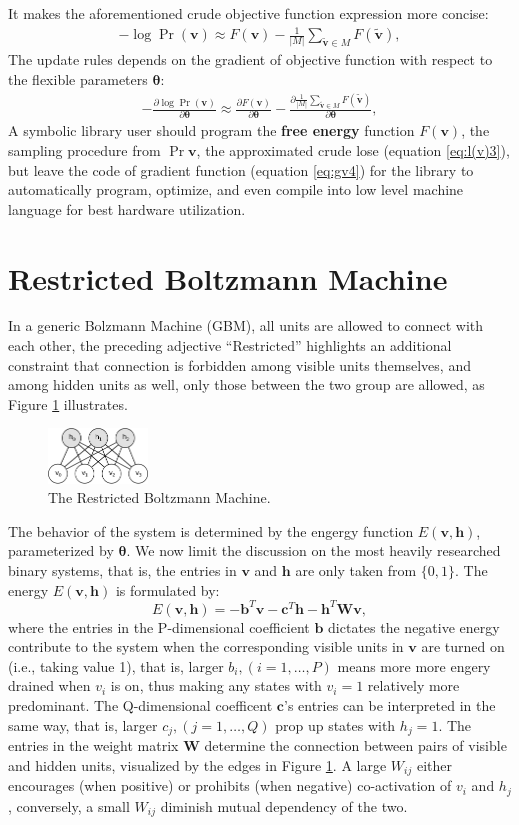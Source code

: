 \documentclass[11pt]{article}
\newcommand{\vb}{\boldsymbol{b}}
\newcommand{\vc}{\boldsymbol{c}}
\newcommand{\vh}{\boldsymbol{h}}
\newcommand{\vv}{\boldsymbol{v}}
\newcommand{\mw}{\boldsymbol{W}}
\newcommand{\vvt}{\tilde{\vv}}
\newcommand{\pEC}{\boldsymbol{\theta}}
\newcommand{\PDV}[2]{\frac{\partial #1}{\partial #2}}
\begin{document}
{It makes the aforementioned crude objective function expression more concise:
\begin{align}\label{eq:l(v)3}
  -\log{\Pr(\vv)} \approx F(\vv) - \frac{1}{|M|}\sum_{\vvt \in M}{F(\vvt)},
\end{align}
The update rules depends on the gradient of objective function with respect to the flexible parameters $\pEC$:
\begin{align}\label{eq:gv4}
  -\PDV{\log{\Pr(\vv)}}{\pEC} \approx \PDV{F(\vv)}{\pEC} - \PDV{\frac{1}{|M|}\sum_{\vvt \in M}{F(\vvt)}}{\pEC},
\end{align}
A symbolic library user should program the \textbf{free energy} function $F(\vv)$, the sampling procedure from $\Pr{\vv}$, the approximated crude lose (equation \ref{eq:l(v)3}), but leave the code of gradient function (equation \ref{eq:gv4}) for the library to automatically program, optimize, and even compile into low level machine language for best hardware utilization.

\section{Restricted Boltzmann Machine}
In a generic Bolzmann Machine (GBM), all units are allowed to connect with each other, the preceding adjective ``Restricted'' highlights an additional constraint that connection is forbidden among visible units themselves, and among hidden units as well, only those between the two group are allowed, as Figure \ref{fig:rbm} illustrates.
\begin{figure}[h]
  \centering
  \includegraphics[width=100px]{img/rbm.png}
  \caption{The Restricted Boltzmann Machine.}\label{fig:rbm}
\end{figure}
The behavior of the system is determined by the engergy function $E(\vv, \vh)$, parameterized by $\pEC$. We now limit the discussion on the most heavily researched binary systems, that is, the entries in $\vv$ and $\vh$ are only taken from $\{0, 1\}$. The energy $E(\vv, \vh)$ is formulated by:
\begin{equation} \label{eq:se_bin}
  E(\vv, \vh) = -\vb^T \vv - \vc^T \vh - \vh^T \mw \vv,
\end{equation}
where the entries in the P-dimensional coefficient $\vb$ dictates the negative energy contribute to the system when the corresponding visible units in $\vv$ are turned on (i.e., taking value 1), that is, larger $b_i, (i=1, \dots, P)$ means more more engery drained when $v_i$ is on, thus making any states with $v_i=1$ relatively more predominant. The Q-dimensional coefficent $\vc$'s entries can be interpreted in the same way, that is, larger $c_j, (j=1, \dots, Q)$ prop up states with $h_j=1$. The entries in the weight matrix $\mw$ determine the connection between pairs of visible and hidden units, visualized by the edges in Figure \ref{fig:rbm}. A large $W_{ij}$ either encourages (when positive) or prohibits (when negative) co-activation of $v_i$ and $h_j$, conversely, a small $W_{ij}$ diminish mutual dependency of the two.
}
\end{document}
